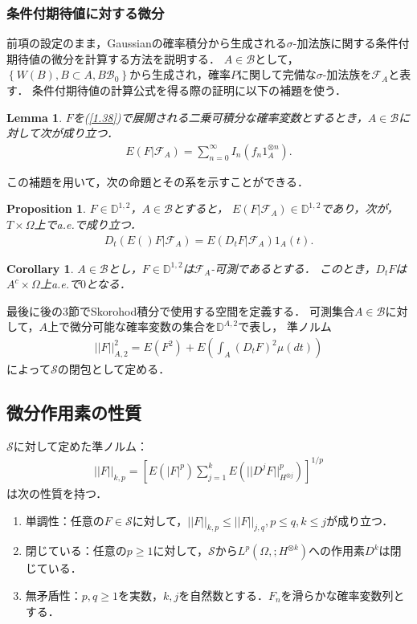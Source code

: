 \documentclass[a4paper,10pt]{jsarticle}
\theoremstyle{plain}
\newtheorem{lemma}{Lemma}
\newtheorem{proposition}{Proposition}
\newtheorem{corollary}{Corollary}
\newcommand{\eq}[1]{\begin{align}#1\end{align}}
\newcommand{\enums}[1]{\begin{enumerate}#1\end{enumerate}}
\begin{document}
\subsubsection{条件付期待値に対する微分}
前項の設定のまま，Gaussianの確率積分から生成される$\sigma$-加法族に関する条件付期待値の微分を計算する方法を説明する．
$A\in\mathcal{B}$として，$\left\{W(B),B\subset A,B\mathcal{B}_0\right\}$から生成され，確率$P$に関して完備な$\sigma$-加法族を$\mathcal{F}_A$と表す．
条件付期待値の計算公式を得る際の証明に以下の補題を使う．
\begin{lemma}\label{lem1.2.5}
$F$を(\ref{1.38})で展開される二乗可積分な確率変数とするとき，$A\in\mathcal{B}$に対して次が成り立つ．
\eq{E\left(F|\mathcal{F}_A\right)=\sum^\infty_{n=0}I_n(f_n1_A^{\otimes n}).}
\end{lemma}
この補題を用いて，次の命題とその系を示すことができる．
\begin{proposition}\label{prop1.2.8}
$F\in\mathbb{D}^{1,2}$，$A\in\mathcal{B}$とすると，
$E\left(F|\mathcal{F}_A\right)\in\mathbb{D}^{1,2}$であり，次が，$T\times\Omega$上でa.e.で成り立つ．
\eq{D_t\left(E()F|\mathcal{F}_A\right)=E\left(D_tF|\mathcal{F}_A\right)1_A(t).}
\end{proposition}
\begin{corollary}\label{cor1.2.1}
$A\in\mathcal{B}$とし，$F\in\mathbb{D}^{1,2}$は$\mathcal{F}_A$-可測であるとする．
このとき，$D_tF$は$A^c\times\Omega$上a.e.で$0$となる．
\end{corollary}

最後に後の3節でSkorohod積分で使用する空間を定義する．
可測集合$A\in\mathcal{B}$に対して，$A$上で微分可能な確率変数の集合を$\mathbb{D}^{A,2}$で表し，
準ノルム
\eq{||F||^2_{A,2}=E(F^2)+E\left(\int_A\left(D_tF\right)^2\mu(dt)\right)}
によって$\mathcal{S}$の閉包として定める．

\subsection{微分作用素の性質}
$\mathcal{S}$に対して定めた準ノルム：
\eq{||F||_{k,p}=\left[E(|F|^p)\sum_{j=1}^kE\left(||D^jF||^p_{H^{\otimes j}}\right)\right]^{1/p}}
は次の性質を持つ．
\enums{
	\item 単調性：任意の$F\in\mathcal{S}$に対して，$||F||_{k,p}\le||F||_{j,q},p\le q,k\le j$が成り立つ．
	\item 閉じている：任意の$p\ge1$に対して，$\mathcal{S}$から$L^p\left(\Omega,;H^{\otimes k}\right)$への作用素$D^k$は閉じている．
	\item 無矛盾性：$p,q\ge1$を実数，$k,j$を自然数とする．$F_n$を滑らかな確率変数列とする．
}
\end{document}
